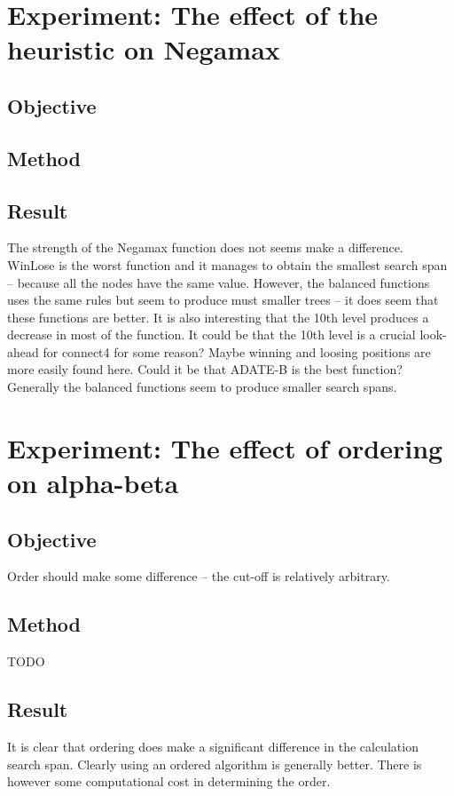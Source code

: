 \section{Experiment: The effect of the heuristic on Negamax}
\subsection*{Objective}
\subsection*{Method}
\subsection*{Result}

The strength of the Negamax function does not seems make a difference.  WinLose is the worst function and it manages to obtain the smallest search span -- because all the nodes have the same value.  However, the balanced functions uses the same rules but seem to produce must smaller trees -- it does seem that these functions are better.  It is also interesting that the 10th level produces a decrease in most of the function.  It could be that the 10th level is a crucial look-ahead for connect4 for some reason? Maybe winning and loosing positions are more easily found here.  Could it be that ADATE-B is the best function?  Generally the balanced functions seem to produce smaller search spans.

\section{Experiment: The effect of ordering on alpha-beta}
\subsection*{Objective}
Order should make some difference -- the cut-off is relatively arbitrary.
\subsection*{Method}
TODO
\subsection*{Result}

It is clear that ordering does make a significant difference in the calculation search span.  Clearly using an ordered algorithm is generally better.  There is however some computational cost in determining the order.  
